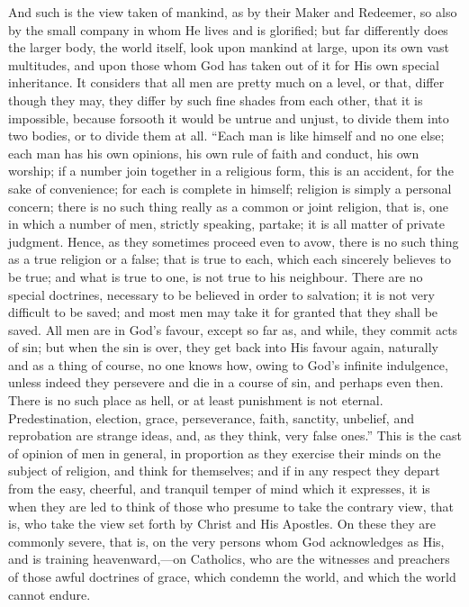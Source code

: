 And such is the view taken of mankind, as by their Maker and
Redeemer, so also by the small company in whom He lives and is
glorified; but far differently does the larger body, the world itself,
look upon mankind at large, upon its own vast multitudes, and upon
those whom God has taken out of it for His own special inheritance. It
considers that all men are pretty much on a level, or that, differ
though they may, they differ by such fine shades from each other, that
it is impossible, because forsooth it would be untrue and unjust, to
divide them into two bodies, or to divide them at all. ``Each man
is like himself and no one else; each man has his own opinions, his
own rule of faith and conduct, his own worship; if a number join
together in a religious form, this is an accident, for the sake of
convenience; for each is complete in himself; religion is simply a
personal concern; there is no such thing really as a common or joint
religion, that is, one in which a number of men, strictly speaking,
partake; it is all matter of private judgment. Hence, as they
sometimes proceed even to avow, there is no such thing as a true
religion or a false; that is true to each, which each sincerely
believes to be true; and what is true to one, is not true to his
neighbour. There are no special doctrines, necessary to be believed in
order to salvation; it is not very difficult to be saved; and most men
may take it for granted that they shall be saved. All men are in God's
favour, except so far as, and while, they commit acts of sin; but when
the sin is over, they get back into His favour again, naturally and as
a thing of course, no one knows how, owing to God's infinite
indulgence, unless indeed they persevere and die in a course of sin,
and perhaps even then. There is no such place as hell, or at least
punishment is not eternal. Predestination, election, grace,
perseverance, faith, sanctity, unbelief, and reprobation are strange
ideas, and, as they think, very false ones.'' This is the cast of
opinion of men in general, in proportion as they exercise their minds
on the subject of religion, and think for themselves; and if in any
respect they depart from the easy, cheerful, and tranquil temper of
mind which it expresses, it is when they are led to think of those who
presume to take the contrary view, that is, who take the view set
forth by Christ and His Apostles. On these they are commonly severe,
that is, on the very persons whom God acknowledges as His, and is
training heavenward,—on Catholics, who are the witnesses and
preachers of those awful doctrines of grace, which condemn the world,
and which the world cannot endure.

